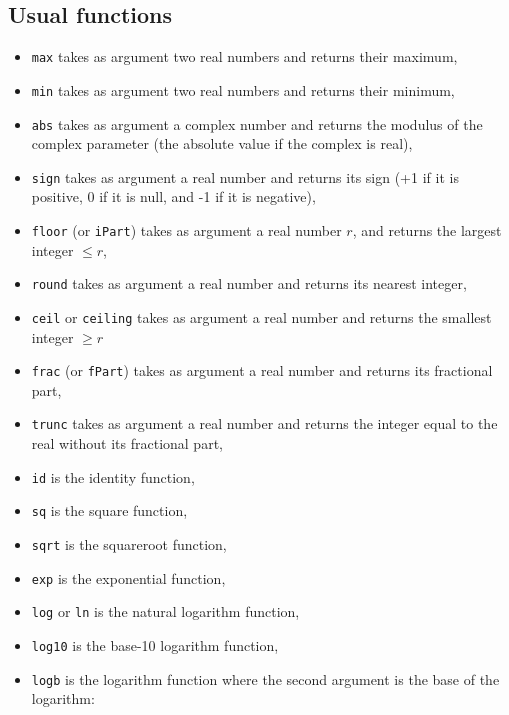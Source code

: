 \documentclass[a4paper,11pt]{book}
\begin{document}
\subsection{Usual functions}
\begin{itemize}
\item {\tt max}  takes as argument two real numbers and 
returns their maximum,
\item
{\tt min}  takes as argument two real numbers and returns 
their minimum,
\item
{\tt abs} takes as argument a complex number and returns the 
modulus of the complex parameter (the absolute value if the complex is
real),
\item
{\tt sign}  takes as argument a real number and returns its
sign (+1 if it is positive, 0 if it is null, and -1 if it is
negative),
\item
{\tt floor} (or {\tt iPart}) 
takes as argument a real number $r$, 
and returns  the largest integer $\leq r$,
\item
{\tt round} takes as argument a real number and returns 
its nearest integer,
\item
{\tt ceil} or {\tt ceiling}  takes as
argument a real number and returns the smallest integer $\geq r$
\item
{\tt frac} (or {\tt fPart})  takes as
argument a real number and returns its fractional part,
\item
{\tt trunc} takes as 
argument a real number and returns the integer equal to the real without its 
fractional part,
\item
{\tt id} is the identity function,
\item
{\tt sq} is the square function,
\item
{\tt sqrt} is the squareroot function,
\item
{\tt exp} is the exponential function,
\item
{\tt log} or {\tt ln} is the 
natural logarithm function,
\item 
{\tt log10} is the base-10 logarithm function,
\item
{\tt logb} is the logarithm function where the second 
argument is the base of the logarithm: 

\end{itemize}
\end{document}
